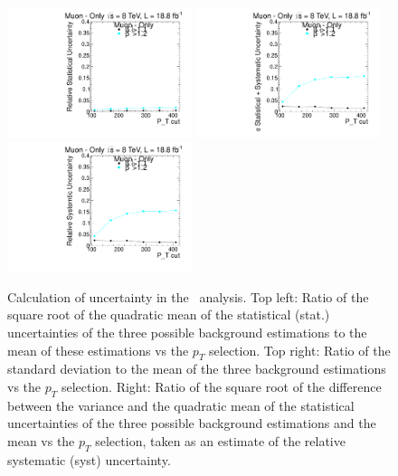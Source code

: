 \begin{figure}
\begin{center}
\includegraphics[clip=false, trim=0.0cm 0cm 0.0cm 0cm, width=0.48\textwidth]{figures/muonly/Data8TeVCollisionStat}
\includegraphics[clip=false, trim=0.0cm 0cm 0.0cm 0cm, width=0.48\textwidth]{figures/muonly/Data8TeVCollisionStatSyst} \\
\includegraphics[clip=false, trim=0.0cm 0cm 0.0cm 0cm, width=0.48\textwidth]{figures/muonly/Data8TeVCollisionSyst}
\caption[Statistical and systematic uncertainties in the background prediction for different sets of thresholds in the \muononly\ analysis.]
{Calculation of uncertainty in the \muononly\ analysis.
Top left: Ratio of the square root of the quadratic
mean of the statistical (stat.) uncertainties of the three possible background
estimations to the mean of these estimations vs
the $p_T$ selection. Top right: Ratio of the standard deviation to the mean of the three
background estimations vs the $p_T$ selection. Right: Ratio of the
square root of the difference between the variance and the quadratic
mean of the statistical uncertainties of the three possible background
estimations and the mean vs the $p_T$ selection, taken as an estimate of the relative systematic (syst) uncertainty.
}
\label{fig:MuOnlyUnc}
\end{center}
\end{figure}

